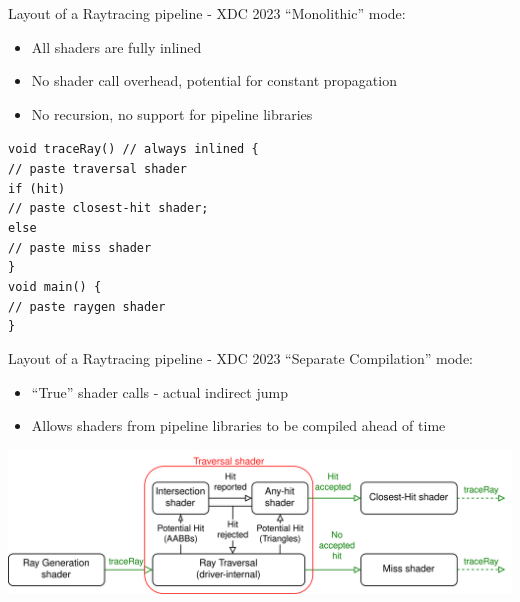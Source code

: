 \documentclass[aspectratio=169,t]{beamer}
\begin{document}
\begin{slide}{Layout of a Raytracing pipeline - XDC 2023}
 ``Monolithic'' mode:
 \begin{itemize}
  \item All shaders are fully inlined
  \item No shader call overhead, potential for constant propagation
  \item No recursion, no support for pipeline libraries
 \end{itemize}
  \texttt{void traceRay() // always inlined \{ \\
  \hspace*{8pt}// paste traversal shader \\
  \hspace*{8pt}if (hit) \\
  \hspace*{16pt}// paste closest-hit shader; \\
  \hspace*{8pt}else \\
  \hspace*{16pt}// paste miss shader \\
  \}} \\
  \texttt{void main() \{ \\
  \hspace*{8pt}// paste raygen shader \\
  \}} \\
\end{slide}

\begin{slide}{Layout of a Raytracing pipeline - XDC 2023}
 ``Separate Compilation'' mode:
 \begin{itemize}
  \item ``True'' shader calls - actual indirect jump
  \item Allows shaders from pipeline libraries to be compiled ahead of time
 \end{itemize}

 \includegraphics[width=1.0651\linewidth]{graphics/RTStages10.png}

\end{slide}
\end{document}
